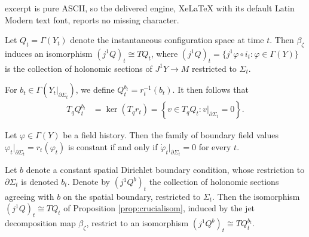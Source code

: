 \documentclass[10pt,a4paper]{amsart}
\begin{document}
excerpt is pure ASCII, so the delivered engine, XeLaTeX with its default Latin Modern text font, reports no missing character.
\begin{proposition}\label{prop:crucialisom}
    Let $Q_t=\Gamma(Y_t)$ denote the instantaneous configuration space at time $t$. Then $\beta_\zeta$ induces an isomorphism $(j^1Q)_t\cong TQ_t$, where $(j^1Q)_t=\{j^1\varphi\circ i_t:\varphi\in\Gamma(Y)\}$ is the collection of holonomic sections of $J^1Y\to M$ restricted to $\Sigma_t$. 
\end{proposition}

\begin{lemma}\label{kernellemma}
For $b_t\in \Gamma(Y_t|_{\partial\Sigma_t})$, we define $Q_t^{b_t}=r_t^{-1}(b_t)$. It then follows that
\begin{align*}
    T_qQ_t^{b_t}
    &= \ker(T_qr_t) = \left\{v\in T_qQ_t :
    v|_{\partial\Sigma_t}=0\right\}.
\end{align*}
\end{lemma}

\begin{lemma}\label{stupidlemma}
    Let $\varphi\in \Gamma(Y)$ be a field history. Then the family of boundary field values $\varphi_t|_{\partial\Sigma_t}=r_t(\varphi_t)$ is constant if and only if $\dot{\varphi}_t|_{\partial\Sigma_t}=0$ for every $t$.
\end{lemma}

\begin{proposition}\label{beautifulprop}
    Let $b$ denote a constant spatial Dirichlet boundary condition, whose restriction to $\partial \Sigma_t$ is denoted $b_t$. Denote by $(j^1Q^b)_t$ the collection of holonomic sections agreeing with $b$ on the spatial boundary, restricted to $\Sigma_t$. Then the isomorphism $(j^1Q)_t\cong TQ_t$ of Proposition \ref{prop:crucialisom}, induced by the jet decomposition map $\beta_\zeta$, restrict to an isomorphism $(j^1Q^b)_t\cong TQ^{b_t}_t$.
\end{proposition}
\end{document}
